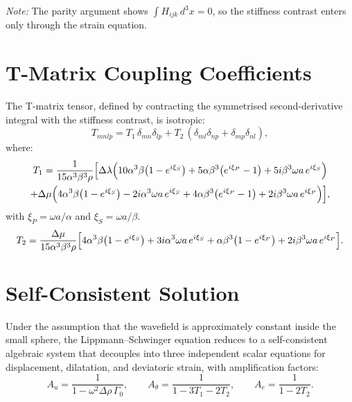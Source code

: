 \smallskip
\noindent
\textit{Note:}  The parity argument shows $\int H_{ijk}\,d^3x = 0$, so the
stiffness contrast enters only through the strain equation.


\section{T-Matrix Coupling Coefficients}

The T-matrix tensor, defined by contracting the symmetrised
second-derivative integral with the stiffness contrast, is isotropic:
\begin{equation}
  T_{mnlp} = T_1\,\delta_{mn}\delta_{lp}
  + T_2\,(\delta_{ml}\delta_{np} + \delta_{mp}\delta_{nl}),
\label{eq:Tiso}
\end{equation}
where:
\begin{multline}
  T_1 = \frac{1}{15\alpha^3\beta^3\rho}\Bigl[
    \Delta\lambda\Bigl(
      10\alpha^3\beta\bigl(1-e^{i\xi_S}\bigr)
      + 5\alpha\beta^3\bigl(e^{i\xi_P}-1\bigr)
      + 5i\beta^3\omega a\,e^{i\xi_S}
    \Bigr) \\
    + \Delta\mu\Bigl(
      4\alpha^3\beta\bigl(1-e^{i\xi_S}\bigr)
      - 2i\alpha^3\omega a\,e^{i\xi_S}
      + 4\alpha\beta^3\bigl(e^{i\xi_P}-1\bigr)
      + 2i\beta^3\omega a\,e^{i\xi_P}
    \Bigr)
  \Bigr],
\label{eq:T1}
\end{multline}
with $\xi_P = \omega a/\alpha$ and $\xi_S = \omega a/\beta$.
\begin{equation}
  T_2 = \frac{\Delta\mu}{15\alpha^3\beta^3\rho}\Bigl[
    4\alpha^3\beta\bigl(1-e^{i\xi_S}\bigr)
    + 3i\alpha^3\omega a\,e^{i\xi_S}
    + \alpha\beta^3\bigl(1-e^{i\xi_P}\bigr)
    + 2i\beta^3\omega a\,e^{i\xi_P}
  \Bigr].
\label{eq:T2}
\end{equation}


\section{Self-Consistent Solution}

Under the assumption that the wavefield is approximately constant inside
the small sphere, the Lippmann--Schwinger equation reduces to a
self-consistent algebraic system that decouples into three independent
scalar equations for displacement, dilatation, and deviatoric strain, with
amplification factors:
\begin{equation}
  A_u = \frac{1}{1-\omega^2\Delta\rho\,\Gamma_0}, \qquad
  A_\theta = \frac{1}{1-3T_1-2T_2}, \qquad
  A_e = \frac{1}{1-2T_2}.
\label{eq:amplsph}
\end{equation}


